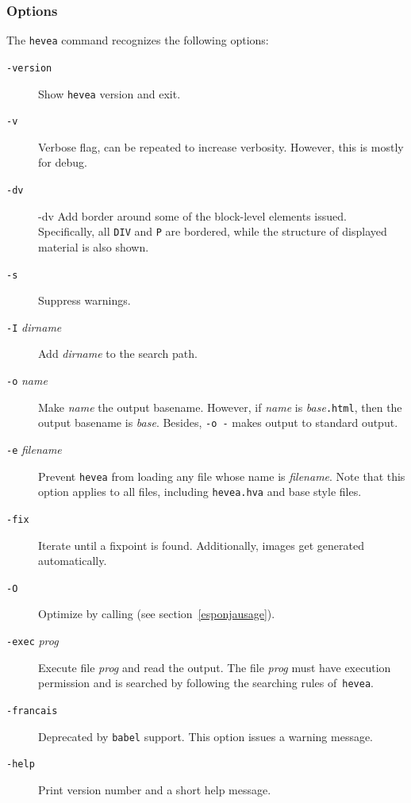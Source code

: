 \subsubsection{Options}\label{heveaoptions}
The \texttt{hevea} command recognizes the following options:
\begin{description}
\item[{\tt -version}] Show \texttt{hevea} version and exit.
\item[{\tt -v}] Verbose flag, can be repeated to increase
verbosity. However, this is mostly for debug.
\item[{\tt -dv}] -dv Add border around some of the block-level
elements issued. Specifically, all \verb+DIV+ and \verb+P+ are bordered,
while the structure of displayed material is also shown.
\item[{\tt -s}] Suppress warnings.
\item[{\tt -I} {\it dirname}] Add {\it dirname} to the search path.
\item[{\tt -o} {\it name}] Make \textit{name} the output basename.
However, if \textit{name} is \textit{base}\texttt{.html}, then
the output basename is \textit{base}.
Besides, {\tt -o -} makes \hevea{} output to standard output.
\item[{\tt -e} {\it filename}] Prevent \texttt{hevea} from loading any file
whose name is \textit{filename}. Note that this option applies to all
files, including \texttt{hevea.hva} and base style files.
\item[{\tt -fix}] Iterate \hevea{} until a fixpoint is found.
Additionally, images get generated automatically.
\item[{\tt -O}] Optimize \html{} by calling \esponja{} (see
section~\ref{esponjausage}).
\item[{\tt -exec} {\it prog}] Execute file \textit{prog} and read the
output. The file \textit{prog} must have execution permission and is
searched by following the searching rules of~\texttt{hevea}.
\item[{\tt -francais}] Deprecated by \texttt{babel} support. This
option issues a warning message.
\item[{\tt -help}] Print version number and a short help message.
\end{description}

